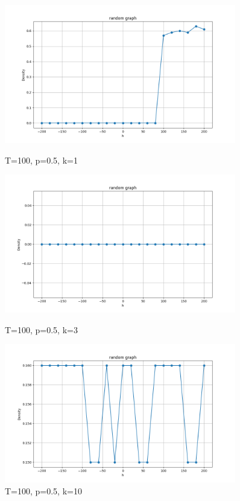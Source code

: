 \documentclass[11pt]{book}
\begin{document}
\begin{figure}
    \centering
    \begin{minipage}{0.45\textwidth}
        \centering
        \includegraphics[width=0.9\textwidth]{rg.T=100,p=0.5,k=1.png} %
        \caption{T=100, p=0.5, k=1}
        \label{fig20}
    \end{minipage}\hfill
    \begin{minipage}{0.45\textwidth}
        \centering
        \includegraphics[width=0.9\textwidth]{rg.T=100 p=0.5 k=3.png} %
        \caption{T=100, p=0.5, k=3}
        \label{fig21}
    \end{minipage}
    \begin{minipage}{0.45\textwidth}
        \centering
        \includegraphics[width=0.9\textwidth]{rg.T=100, p=0.5, k=10.png} %
        \caption{T=100, p=0.5, k=10}
        \label{fig22}
    \end{minipage}\hfill
\end{figure}
\end{document}
